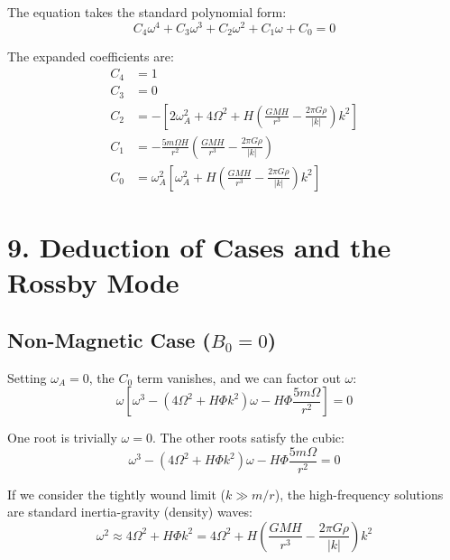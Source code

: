 \documentclass[11pt]{article}
\begin{document}
The equation takes the standard polynomial form:
\begin{equation}
C_4\omega^4 + C_3\omega^3 + C_2\omega^2 + C_1\omega + C_0 = 0
\end{equation}

The expanded coefficients are:
\begin{align}
C_4 &= 1 \\
C_3 &= 0 \\
C_2 &= - \left[ 2\omega_A^2 + 4\Omega^2 + H \left( \frac{GM H}{r^3} - \frac{2\pi G \rho}{|k|} \right) k^2 \right] \\
C_1 &= - \frac{5m\Omega H}{r^2} \left( \frac{GM H}{r^3} - \frac{2\pi G \rho}{|k|} \right) \\
C_0 &= \omega_A^2 \left[ \omega_A^2 + H \left( \frac{GM H}{r^3} - \frac{2\pi G \rho}{|k|} \right) k^2 \right]
\end{align}

\section*{9. Deduction of Cases and the Rossby Mode}

\subsection*{Non-Magnetic Case ($B_0 = 0$)}
Setting $\omega_A = 0$, the $C_0$ term vanishes, and we can factor out $\omega$:
\begin{equation}
\omega \left[ \omega^3 - \left( 4\Omega^2 + H\Phi k^2 \right)\omega - H\Phi\frac{5m\Omega}{r^2} \right] = 0
\end{equation}

One root is trivially $\omega = 0$. The other roots satisfy the cubic:
\begin{equation}
\omega^3 - \left( 4\Omega^2 + H\Phi k^2 \right)\omega - H\Phi\frac{5m\Omega}{r^2} = 0
\end{equation}

If we consider the tightly wound limit ($k \gg m/r$), the high-frequency solutions are standard inertia-gravity (density) waves:
\begin{equation}
\omega^2 \approx 4\Omega^2 + H\Phi k^2 = 4\Omega^2 + H\left( \frac{GM H}{r^3} - \frac{2\pi G \rho}{|k|} \right) k^2
\end{equation}
\end{document}
